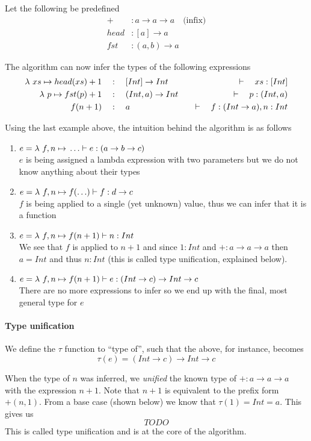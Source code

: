 Let the following be predefined
\begin{align*}
  +      & : a \to a \to a   \quad\text{(infix)}\\
  head   & : [a] \to a   \\
  fst    & : (a, b) \to a
\end{align*}

The algorithm can now infer the types of the following expressions
\begin{align*}
  \lambda{} \ xs \mapsto{} head(xs) + 1 & \quad:\quad [Int] \to Int    & \quad\vdash\quad xs : [Int]             \\
  \lambda{} \ p \mapsto{} fst(p) + 1    & \quad:\quad (Int, a) \to Int & \quad\vdash\quad p : (Int, a)           \\
  f(n + 1)              & \quad:\quad a                & \quad\vdash\quad f: (Int \to a), n: Int \\
\end{align*}

Using the last example above, the intuition behind the algorithm is as follows
\begin{enumerate}
\item $e = \lambda{} \ f, n \mapsto{} \ldots \vdash e: (a \to b \to c)$ \\
  $e$ is being assigned a lambda expression with two parameters but we do not know anything about their types
\item $e = \lambda{} \ f, n \mapsto{} f(\ldots) \vdash f: d \to c$ \\
  $f$ is being applied to a single (yet unknown) value, thus we can infer that it is a function
\item $e = \lambda{} \ f, n \mapsto{} f(n + 1) \vdash n : Int$ \\
  We see that $f$ is applied to $n+1$ and since $1: Int$ and $+:a \to a \to a$ then $a = Int$ and thus $n:Int$ (this is called type unification, explained below).
\item $e = \lambda{} \ f, n \mapsto{} f(n + 1) \vdash e : (Int \to c) \to Int \to c$ \\
  There are no more expressions to infer so we end up with the final, most general type for $e$
\end{enumerate}

\paragraph{Type unification}
We define the $\tau$ function to ``type of'', such that the above, for instance, becomes
\[ \tau(e) = (Int \to c) \to Int \to c \]

When the type of $n$ was inferred, we \emph{unified} the known type of $+:a \to a \to a$ with the expression $n + 1$. Note that $n + 1$ is equivalent to the prefix form $+(n, 1)$. From a base case (shown below) we know that $\tau(1) = Int = a$. This gives us
\[ TODO \]
This is called type unification and is at the core of the algorithm.

